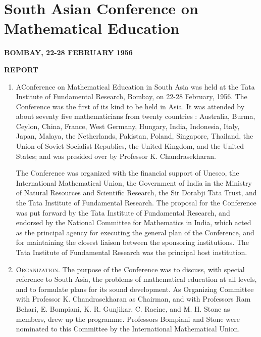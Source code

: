 \chapter{South Asian Conference on Mathematical Education}

\begin{center}
{\bf BOMBAY, 22-28 FEBRUARY 1956}
\medskip

{\bf REPORT}
\end{center}

\begin{enumerate}
\item A\pageoriginale Conference on Mathematical Education in South Asia was held at the Tata Institute of Fundamental Research, Bombay, on 22-28 February, 1956. The Conference was the first of its kind to be held in Asia. It was attended by about seventy five mathematicians from twenty countries : Australia, Burma, Ceylon, China, France, West Germany, Hungary, India, Indonesia, Italy, Japan, Malaya, the Netherlands, Pakistan, Poland, Singapore, Thailand, the Union of Soviet Socialist Republics, the United Kingdom, and the United States; and was presided over by Professor K. Chandrasekharan.

The Conference was organized with the financial support of Unesco, the International Mathematical Union, the Government of India in the Ministry of Natural Resources and Scientific Research, the Sir Dorabji Tata Trust, and the Tata Institute of Fundamental Research. The proposal for the Conference was put forward by the Tata Institute of Fundamental Research, and endorsed by the National Committee for Mathematics in India, which acted as the principal agency for executing the general plan of the Conference, and for maintaining the closest liaison between the sponsoring institutions. The Tata Institute of Fundamental Research was the principal host institution.

\item \textsc{Organization.} The purpose of the Conference was to discuss, with special reference to South Asia, the problems of mathematical education at all levels, and to formulate plans for its sound development. As Organizing Committee with Professor K. Chandrasekharan as Chairman, and with Professors Ram Behari, E. Bompiani, K. R. Gunjikar, C. Racine, and M. H. Stone as members, drew up the programme. Professors Bompiani and Stone were nominated to this Committee by the International Mathematical Union.


\end{enumerate}
